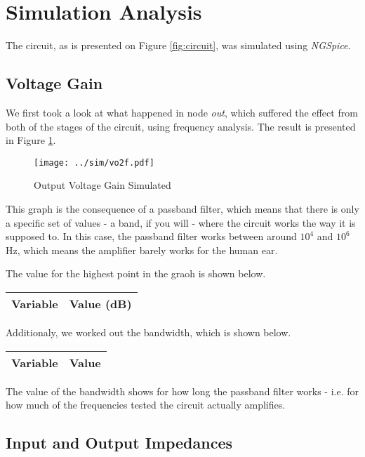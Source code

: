 \clearpage

\section{Simulation Analysis}
\label{sec:simulation}

The circuit, as is presented on Figure \ref{fig:circuit}, was simulated using \textit{NGSpice}.

\subsection{Voltage Gain}

We first took a look at what happened in node \textit{out}, which suffered the effect from both of the stages of the circuit, using frequency analysis. The result is presented in Figure \ref{fig:vo2f}.

\begin{figure}[h] \centering
\texttt{[image: ../sim/vo2f.pdf]}
\caption{Output Voltage Gain Simulated}
\label{fig:vo2f}
\end{figure}

This graph is the consequence of a passband filter, which means that there is only a specific set of values - a band, if you will - where the circuit works the way it is supposed to. In this case, the passband filter works between around $10^4$ and $10^6$ Hz, which means the amplifier barely works for the human ear.

The value for the highest point in the graoh is shown below.

\begin{tabular}{|l|r|}
  \hline    
  {\bf Variable} & {\bf Value (dB)} \\ \hline
  
\end{tabular}

Additionaly, we worked out the bandwidth, which is shown below.

\begin{tabular}{|l|r|}
  \hline    
  {\bf Variable} & {\bf Value} \\ \hline
  
\end{tabular}

The value of the bandwidth shows for how long the passband filter works - i.e. for how much of the frequencies tested the circuit actually amplifies.

\subsection{Input and Output Impedances}

